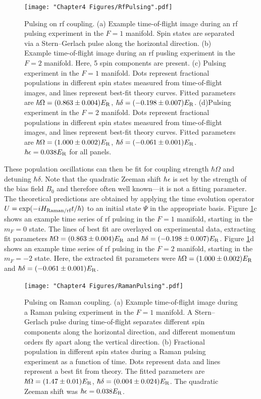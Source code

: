 \begin{figure}
	\texttt{[image: "Chapter4 Figures/RfPulsing".pdf]}
\caption[Pulsing on rf coupling]{Pulsing on rf coupling. (a) Example time-of-flight image during an rf pulsing experiment in the $F=1$ manifold. Spin states are separated via a Stern--Gerlach pulse along the horizontal direction. (b) Example time-of-flight image during an rf pusling experiment in the $F=2$ manifold. Here, 5 spin components are present.  (c) Pulsing experiment in the $F=1$ manifold. Dots represent fractional populations in different spin states measured from time-of-flight images, and lines represent best-fit theory curves.  Fitted parameters are $\hbar\Omega=(0.863\pm0.004) E_{\rm R}$, $\hbar\delta=(-0.198\pm0.007) E_{\rm R}$. (d)Pulsing experiment in the $F=2$ manifold. Dots represent fractional populations in different spin states measured from time-of-flight images, and lines represent best-fit theory curves. Fitted parameters are $\hbar\Omega=(1.000\pm0.002) E_{\rm R}$, $\hbar\delta = (-0.061\pm0.001) E_{\rm R}$. $\hbar\epsilon=0.038 E_{\rm R}$ for all panels.}
\label{fig:RfPulsing}
\end{figure}

These population oscillations can then be fit for coupling strength $\hbar\Omega$ and detuning $\hbar\delta$. Note that the quadratic Zeeman shift $\hbar\epsilon$ is set by the strength of the bias field $B_0$ and therefore often well known---it is not a fitting parameter. The theoretical predictions are obtained by applying the time evolution operator $U={\rm exp}(-i H_{\rm Raman/rf} t/\hbar)$ to an initial state $\Psi$ in the appropriate basis. Figure \ref{fig:RfPulsing}c shows an example time series of rf pulsing in the $F=1$ manifold, starting in the $m_F=0$ state. The lines of best fit are overlayed on experimental data, extracting fit parameters $\hbar\Omega=(0.863\pm0.004) E_{\rm R}$ and $\hbar\delta=(-0.198\pm0.007) E_{\rm R}$. Figure \ref{fig:RfPulsing}d shows an example time series of rf pulsing in the $F=2$ manifold, starting in the $m_F=-2$ state. Here, the extracted fit parameters were $\hbar\Omega=(1.000\pm0.002) E_{\rm R}$ and $\hbar\delta = (-0.061\pm0.001) E_{\rm R}$.

\begin{figure}
	\texttt{[image: "Chapter4 Figures/RamanPulsing".pdf]}
\caption[Pulsing on Raman coupling]{Pulsing on Raman coupling. (a) Example time-of-flight image during a Raman pulsing experiment in the $F=1$ manifold. A Stern--Gerlach pulse during time-of-flight separates different spin components along the horizontal direction, and different momentum orders fly apart along the vertical direction. (b) Fractional population in different spin states during a Raman pulsing experiment as a function of time. Dots represent data and lines represent a best fit from theory. The fitted parameters are $\hbar\Omega=(1.47\pm0.01) E_{\rm R}$, $\hbar\delta =( 0.004\pm0.024) E_{\rm R}$. The quadratic Zeeman shift was $\hbar\epsilon=0.038 E_{\rm R}$. }
\label{fig:RamanPulsing}
\end{figure}

